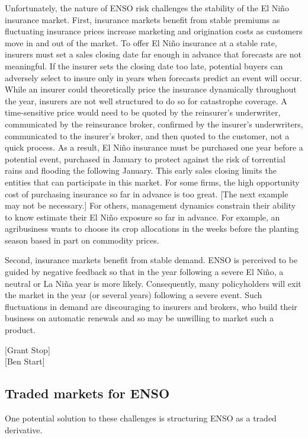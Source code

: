 \documentclass[authoryear]{article}
\begin{document}
Unfortunately, the nature of ENSO risk challenges the stability of the El Ni\~no insurance market. First, insurance markets benefit from stable premiums as fluctuating insurance prices increase marketing and origination costs as customers move in and out of the market. To offer El Ni\~no insurance at a stable rate, insurers must set a sales closing date far enough in advance that forecasts are not meaningful. If the insurer sets the closing date too late, potential buyers can adversely select to insure only in years when forecasts predict an event will occur. While an insurer could theoretically price the insurance dynamically throughout the year, insurers are not well structured to do so for catastrophe coverage. A time-sensitive price would need to be quoted by the reinsurer's underwriter, communicated by the reinsurance broker, confirmed by the insurer's underwriters, communicated to the insurer's broker, and then quoted to the customer, not a quick process. 
As a result, El Ni\~no insurance must be purchased one year before a potential event, purchased in January to protect against the risk of torrential rains and flooding the following January. This early sales closing limits the entities that can participate in this market. For some firms, the high opportunity cost of purchasing insurance so far in advance is too great. [The next example may not be necessary.] For others, management dynamics constrain their ability to know estimate their El Ni\~no exposure so far in advance. For example, an agribusiness wants to choose its crop allocations in the weeks before the planting season based in part on commodity prices.

Second, insurance markets benefit from stable demand. ENSO is perceived to be guided by negative feedback so that in the year following a severe El Ni\~no, a neutral or La Ni\~na year is more likely. Consequently, many policyholders will exit the market in the year (or several years) following a severe event. Such fluctuations in demand are discouraging to insurers and brokers, who build their business on automatic renewals and so may be unwilling to market such a product.

[Grant Stop]\\

[Ben Start]


\subsection{Traded markets for ENSO}
One potential solution to these challenges is structuring ENSO as a traded derivative.
\end{document}
